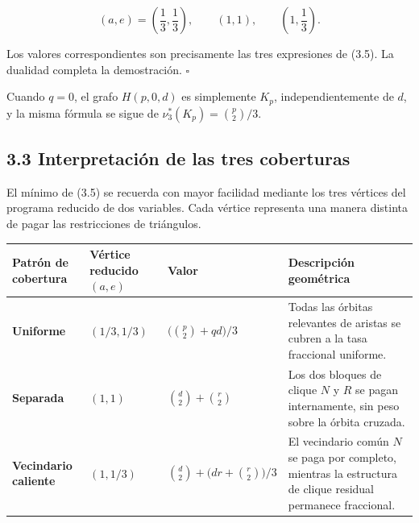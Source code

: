 \documentclass[
  spanish,
  11pt,
  a4paper,
]{article}
\newcounter{none} %
\begin{document}
\[
(a,e)=\left(\frac13,\frac13\right),
\qquad
(1,1),
\qquad
\left(1,\frac13\right).
\]

Los valores correspondientes son precisamente las tres expresiones de (3.5). La dualidad completa la demostración. \(\square\)

Cuando \(q=0\), el grafo \(H(p,0,d)\) es simplemente \(K_p\), independientemente de \(d\), y la misma fórmula se sigue de \(\nu_3^*(K_p)=\binom p2/3\).

\subsection{3.3 Interpretación de las tres coberturas}\label{interpretaciuxf3n-de-las-tres-coberturas}

El mínimo de (3.5) se recuerda con mayor facilidad mediante los tres vértices del programa reducido de dos variables. Cada vértice representa una manera distinta de pagar las restricciones de triángulos.

{\def\LTcaptype{none} %
\begin{longtable}[]{@{}
  >{\raggedright\arraybackslash}p{}
  >{\raggedleft\arraybackslash}p{}
  >{\raggedleft\arraybackslash}p{}
  >{\raggedright\arraybackslash}p{}@{}}
\toprule\noalign{}
\begin{minipage}[b]{\linewidth}\raggedright
Patrón de cobertura
\end{minipage} & \begin{minipage}[b]{\linewidth}\raggedleft
Vértice reducido \((a,e)\)
\end{minipage} & \begin{minipage}[b]{\linewidth}\raggedleft
Valor
\end{minipage} & \begin{minipage}[b]{\linewidth}\raggedright
Descripción geométrica
\end{minipage} \\
\midrule\noalign{}
\endhead
\bottomrule\noalign{}
\endlastfoot
\textbf{Uniforme} & \((1/3,1/3)\) & \(\bigl(\binom p2+qd\bigr)/3\) & Todas las órbitas relevantes de aristas se cubren a la tasa fraccional uniforme. \\
\textbf{Separada} & \((1,1)\) & \(\binom d2+\binom r2\) & Los dos bloques de clique \(N\) y \(R\) se pagan internamente, sin peso sobre la órbita cruzada. \\
\textbf{Vecindario caliente} & \((1,1/3)\) & \(\binom d2+\bigl(dr+\binom r2\bigr)/3\) & El vecindario común \(N\) se paga por completo, mientras la estructura de clique residual permanece fraccional. \\
\end{longtable}
}
\end{document}
